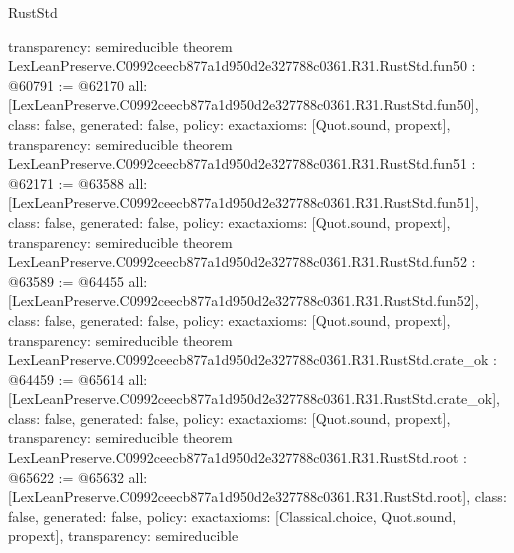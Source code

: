 \begin{lexlean}{RustStd}
\begin{coremodule}
{  transparency: semireducible
}
theorem LexLeanPreserve.C0992ceecb877a1d950d2e327788c0361.R31.RustStd.fun50 : @60791 := @62170 {
  all: [LexLeanPreserve.C0992ceecb877a1d950d2e327788c0361.R31.RustStd.fun50],
  class: false,
  generated: false,
  policy: exact{axioms: [Quot.sound, propext]},
  transparency: semireducible
}
theorem LexLeanPreserve.C0992ceecb877a1d950d2e327788c0361.R31.RustStd.fun51 : @62171 := @63588 {
  all: [LexLeanPreserve.C0992ceecb877a1d950d2e327788c0361.R31.RustStd.fun51],
  class: false,
  generated: false,
  policy: exact{axioms: [Quot.sound, propext]},
  transparency: semireducible
}
theorem LexLeanPreserve.C0992ceecb877a1d950d2e327788c0361.R31.RustStd.fun52 : @63589 := @64455 {
  all: [LexLeanPreserve.C0992ceecb877a1d950d2e327788c0361.R31.RustStd.fun52],
  class: false,
  generated: false,
  policy: exact{axioms: [Quot.sound, propext]},
  transparency: semireducible
}
theorem LexLeanPreserve.C0992ceecb877a1d950d2e327788c0361.R31.RustStd.crate_ok : @64459 := @65614 {
  all: [LexLeanPreserve.C0992ceecb877a1d950d2e327788c0361.R31.RustStd.crate_ok],
  class: false,
  generated: false,
  policy: exact{axioms: [Quot.sound, propext]},
  transparency: semireducible
}
theorem LexLeanPreserve.C0992ceecb877a1d950d2e327788c0361.R31.RustStd.root : @65622 := @65632 {
  all: [LexLeanPreserve.C0992ceecb877a1d950d2e327788c0361.R31.RustStd.root],
  class: false,
  generated: false,
  policy: exact{axioms: [Classical.choice, Quot.sound, propext]},
  transparency: semireducible
}


\end{coremodule}
\end{lexlean}
